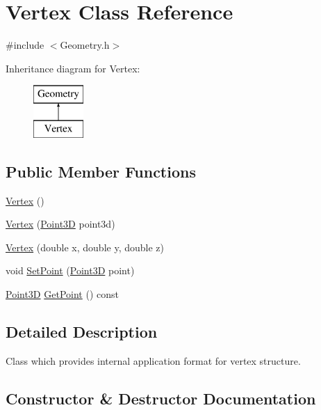 \hypertarget{class_vertex}{}\section{Vertex Class Reference}
\label{class_vertex}


{\ttfamily \#include $<$Geometry.\+h$>$}

Inheritance diagram for Vertex\+:\begin{figure}[H]
\begin{center}
\leavevmode
\includegraphics[height=2.000000cm]{class_vertex}
\end{center}
\end{figure}
\subsection*{Public Member Functions}
\begin{DoxyCompactItemize}
\item 
\hyperlink{class_vertex_a97488994a2482d70da74e1b91d40e169}{Vertex} ()
\item 
\hyperlink{class_vertex_a8531fa03e22d722369a91dc038467379}{Vertex} (\hyperlink{class_point3_d}{Point3D} point3d)
\item 
\hyperlink{class_vertex_ac3f28a791455bbd53724c8775c549b43}{Vertex} (double x, double y, double z)
\item 
void \hyperlink{class_vertex_afe14654ec1e3303294c53f4ed2a534f1}{Set\+Point} (\hyperlink{class_point3_d}{Point3D} point)
\item 
\hyperlink{class_point3_d}{Point3D} \hyperlink{class_vertex_a737ca423a44989a7dfc5ffa92e890781}{Get\+Point} () const
\end{DoxyCompactItemize}


\subsection{Detailed Description}
Class which provides internal application format for \textquotesingle{}vertex\textquotesingle{} structure. 

\subsection{Constructor \& Destructor Documentation}
\hypertarget{class_vertex_a97488994a2482d70da74e1b91d40e169}{}\label{class_vertex_a97488994a2482d70da74e1b91d40e169} 
